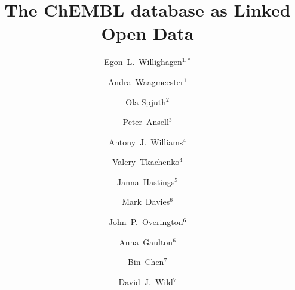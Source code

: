 \documentclass[10pt]{bmc_article}
\newenvironment{bmcformat}{\begin{raggedright}\baselineskip20pt\sloppy\setboolean{publ}{false}}{\end{raggedright}\baselineskip20pt\sloppy}
\begin{document}
\begin{bmcformat}

\title{The ChEMBL database as Linked Open Data}
 
\author{Egon~L.~Willighagen$^{1,*}$\and
Andra~Waagmeester$^1$\and
Ola Spjuth$^2$\and
Peter~Ansell$^3$\and
Antony~J.~Williams$^4$\and
Valery~Tkachenko$^4$\and
Janna~Hastings$^5$\and
Mark~Davies$^6$\and
John~P.~Overington$^6$\and
Anna~Gaulton$^6$\and
Bin~Chen$^7$\and
David~J.~Wild$^7$
}

\address{\iid(1)Department of Bioinformatics - BiGCaT, Maastricht University, P.O. Box 616, UNS50 Box 19, NL-6200 MD, Maastricht, The Netherlands  \\
\iid(2)Department of Pharmaceutical Biosciences, Uppsala University, PO Box 591, SE-751 24, Uppsala, Sweden \\
\iid(3)School of Information Technology and Electronic Engineering, University of Queensland, St Lucia, Qld 4072, Australia \\
\iid(4)Royal Society of Chemistry, 904 Tamaras Circle, Wake Forest, NC 27587, U.S.A. \\
\iid(5)Cheminformatics and Metabolism, European Bioinformatics Institute, Wellcome Trust Genome Campus, Hinxton, Cambridgeshire, CB10 1SD, United Kingdom \\
\iid(6)Chemogenomics, European Bioinformatics Institute, Wellcome Trust Genome Campus, Hinxton, Cambridgeshire, CB10 1SD, United Kingdom \\ 
\iid(7)School of Informatics and Computing, Indiana University, Bloomington, IN, U.S.A.
}

\maketitle


\end{bmcformat}
\end{document}
